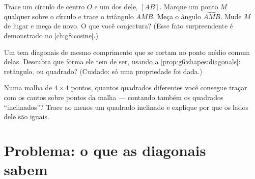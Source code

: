 \begin{exercise}[$\star\star$]\label{exo:g6:shapes:10}
Trace um círculo de centro $O$ e um dos  dele, $[AB]$. Marque
um ponto $M$ qualquer sobre o círculo e trace o triângulo $AMB$. Meça o
ângulo $\widehat{AMB}$. Mude $M$ de lugar e meça de novo. O que você
conjectura? (Esse fato surpreendente é demonstrado no
\cref{ch:g8:cosine}.)
\end{exercise}

\begin{exercise}[$\star\star$]\label{exo:g6:shapes:11}
Um  tem diagonais de mesmo comprimento que se cortam no
ponto médio comum delas. Descubra que forma ele tem de ser, usando a
\cref{prop:g6:shapes:diagonals}: retângulo,  ou quadrado?
(Cuidado: só uma propriedade foi dada.)
\end{exercise}

\begin{exercise}[$\star\star\star$]\label{exo:g6:shapes:12}
Numa malha de $4 \times 4$ pontos, quantos quadrados diferentes você
consegue traçar com os cantos sobre pontos da malha --- contando também
os quadrados ``inclinados''? Trace ao menos um quadrado inclinado e
explique por que os lados dele são iguais.
\end{exercise}

\section{Problema: o que as diagonais sabem}

